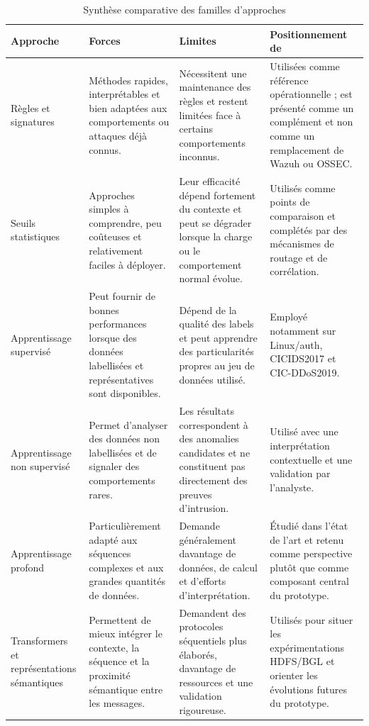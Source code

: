\begin{table}[H]
\centering
\caption{Synthèse comparative des familles d'approches}
\label{tab:etat-art-comparaison}
\scriptsize

\begin{tabularx}{\textwidth}{p{2.8cm}p{3.5cm}p{3.5cm}X}
\toprule
\textbf{Approche} &
\textbf{Forces} &
\textbf{Limites} &
\textbf{Positionnement de \logminer{}} \\
\midrule

Règles et signatures &
Méthodes rapides, interprétables et bien adaptées aux comportements ou attaques déjà connus. &
Nécessitent une maintenance des règles et restent limitées face à certains comportements inconnus. &
Utilisées comme référence opérationnelle ; \logminer{} est présenté comme un complément et non comme un remplacement de Wazuh ou OSSEC. \\

Seuils statistiques &
Approches simples à comprendre, peu coûteuses et relativement faciles à déployer. &
Leur efficacité dépend fortement du contexte et peut se dégrader lorsque la charge ou le comportement normal évolue. &
Utilisés comme points de comparaison et complétés par des mécanismes de routage et de corrélation. \\

Apprentissage supervisé &
Peut fournir de bonnes performances lorsque des données labellisées et représentatives sont disponibles. &
Dépend de la qualité des labels et peut apprendre des particularités propres au jeu de données utilisé. &
Employé notamment sur Linux/auth, CICIDS2017 et CIC-DDoS2019. \\

Apprentissage non supervisé &
Permet d'analyser des données non labellisées et de signaler des comportements rares. &
Les résultats correspondent à des anomalies candidates et ne constituent pas directement des preuves d'intrusion. &
Utilisé avec une interprétation contextuelle et une validation par l'analyste. \\

Apprentissage profond &
Particulièrement adapté aux séquences complexes et aux grandes quantités de données. &
Demande généralement davantage de données, de calcul et d'efforts d'interprétation. &
Étudié dans l'état de l'art et retenu comme perspective plutôt que comme composant central du prototype. \\

Transformers et représentations sémantiques &
Permettent de mieux intégrer le contexte, la séquence et la proximité sémantique entre les messages. &
Demandent des protocoles séquentiels plus élaborés, davantage de ressources et une validation rigoureuse. &
Utilisés pour situer les expérimentations HDFS/BGL et orienter les évolutions futures du prototype. \\


\end{tabularx}
\end{table}
